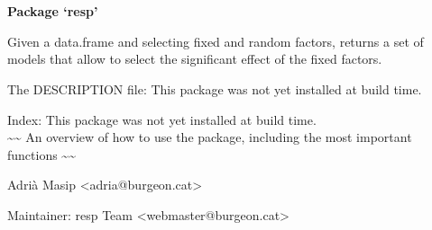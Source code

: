 \documentclass[letterpaper]{book}
\begin{document}
\chapter*{}
\begin{center}
{\textbf{\huge Package `resp'}}
\par\bigskip{\large \today}
\end{center}
\begin{description}
\raggedright{}
\item[Title]
\item[Version]
\item[Description]
\item[Depends]
\item[Imports]
\item[Encoding]
\item[Author]\AsIs{}
\item[Maintainer]\AsIs{}
\item[License]
\end{description}
%
\begin{Description}\relax
Given a data.frame and selecting fixed and random factors, returns a set of models that allow to select the significant effect of the fixed factors.
\end{Description}
%
\begin{Details}\relax

The DESCRIPTION file:
This package was not yet installed at build time.\\{}

Index:  This package was not yet installed at build time.\\{}
\textasciitilde{}\textasciitilde{} An overview of how to use the package, including the most important functions \textasciitilde{}\textasciitilde{}
\end{Details}
%
\begin{Author}\relax
Adrià Masip <adria@burgeon.cat>

Maintainer: resp Team <webmaster@burgeon.cat>
\end{Author}
\end{document}
